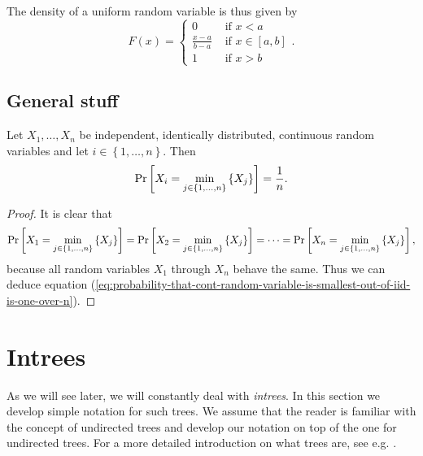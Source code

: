 The density of a uniform random variable is thus given by
\begin{equation*}
  F(x) = \begin{cases}
    0 & \text{ if } x<a \\
    \frac{x-a}{b-a} & \text{ if } x\in\left[ a,b \right] \\
    1 & \text{ if } x>b
  \end{cases}.
\end{equation*}


\subsection{General stuff}
\label{sec:probability-misc}

\begin{theorem}
  Let $X_1,\dots,X_n$ be independent, identically distributed, continuous random variables and let $i\in\left\{ 1,\dots,n \right\}$. Then 
  \begin{equation}
    \label{eq:probability-that-cont-random-variable-is-smallest-out-of-iid-is-one-over-n}
    \operatorname{Pr}\left[X_i = \min_{j\in\left\{ 1,\dots,n \right\}}\left\{ X_j \right\}\right] = \frac{1}{n}.
  \end{equation}
\end{theorem}

\begin{proof}
  It is clear that 
  \begin{equation*}
    \operatorname{Pr}\left[X_1 = \min_{j\in\left\{ 1,\dots,n \right\}}\left\{ X_j \right\}\right] = \operatorname{Pr}\left[X_2 = \min_{j\in\left\{ 1,\dots,n \right\}}\left\{ X_j \right\}\right] = \dots = \operatorname{Pr}\left[X_n = \min_{j\in\left\{ 1,\dots,n \right\}}\left\{ X_j \right\}\right],
  \end{equation*}
  because all random variables $X_1$ through $X_n$ behave the same. Thus we can deduce equation (\ref{eq:probability-that-cont-random-variable-is-smallest-out-of-iid-is-one-over-n}).
\end{proof}

\section{Intrees}
\label{sec:foundations-graph-theory}

As we will see later, we will constantly deal with \emph{intrees}. In this section we develop simple notation for such trees. We assume that the reader is familiar with the concept of undirected trees and develop our notation on top of the one for undirected trees. For a more detailed introduction on what trees are, see e.g. \cite{diestel2005graph}.

